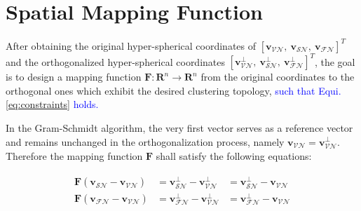 \section{Spatial Mapping Function}
After obtaining the original hyper-spherical coordinates of $[\mathbf{v}_{\mathcal{VN}},~\mathbf{v}_{\mathcal{SN}},~\mathbf{v}_{\mathcal{FN}}]^T$ and the orthogonalized hyper-spherical coordinates $[\mathbf{v}_{\mathcal{VN}}^{\perp},~\mathbf{v}_{\mathcal{SN}}^{\perp},~\mathbf{v}_{\mathcal{FN}}^{\perp}]^T$, the goal is to design a mapping function $\mathbf{F}: \mathbf{R}^n \to \mathbf{R}^n$ from the original coordinates to the orthogonal ones which exhibit the desired clustering topology, \textcolor{blue}{such that Equi. \ref{eq:constraints} holds.}

In the Gram-Schmidt algorithm, the very first vector serves as a reference vector and remains unchanged in the orthogonalization process, namely $\mathbf{v}_{\mathcal{VN}} = \mathbf{v}_{\mathcal{VN}}^{\perp}$. Therefore the mapping function $\mathbf{F}$ shall satisfy the following equations:

\begin{align}
\label{eq:constraints}
\begin{aligned}
\mathbf{F}(\mathbf{v}_{\mathcal{SN}} - \mathbf{v}_{\mathcal{VN}}) &= \mathbf{v}_{\mathcal{SN}}^{\perp} - \mathbf{v}_{\mathcal{VN}}^{\perp} &= \mathbf{v}_{\mathcal{SN}}^{\perp} - \mathbf{v}_{\mathcal{VN}}\\
\mathbf{F}(\mathbf{v}_{\mathcal{FN}} - \mathbf{v}_{\mathcal{VN}}) &= \mathbf{v}_{\mathcal{FN}}^{\perp} - \mathbf{v}_{\mathcal{VN}}^{\perp} &= \mathbf{v}_{\mathcal{FN}}^{\perp} - \mathbf{v}_{\mathcal{VN}}
\end{aligned}
\end{align}

